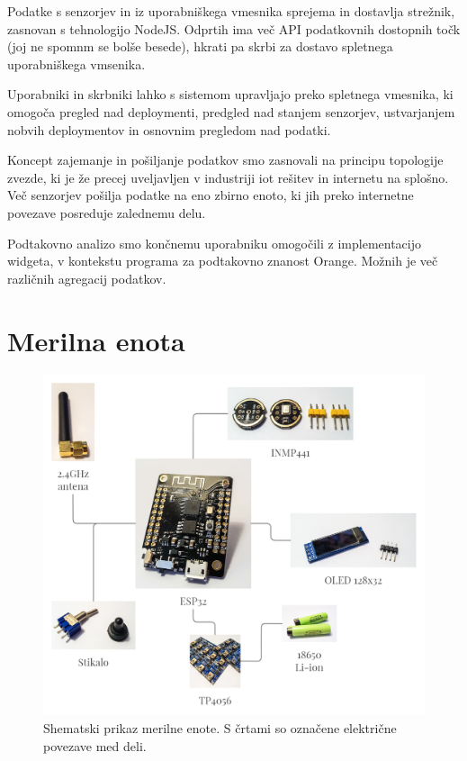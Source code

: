 \documentclass[a4paper, 12pt]{book}
\begin{document}
Podatke s senzorjev in iz uporabniškega vmesnika sprejema in dostavlja strežnik, zasnovan s tehnologijo NodeJS. Odprtih ima več API podatkovnih dostopnih točk (joj ne spomnm se bolše besede), hkrati pa skrbi za dostavo spletnega uporabniškega vmsenika. 

Uporabniki in skrbniki lahko s sistemom upravljajo preko spletnega vmesnika, ki omogoča pregled nad deploymenti, predgled nad stanjem senzorjev, ustvarjanjem nobvih deploymentov in osnovnim pregledom nad podatki.

Koncept zajemanje in pošiljanje podatkov smo zasnovali na principu topologije zvezde, ki je že precej uveljavljen v industriji iot rešitev in internetu na splošno. Več senzorjev pošilja podatke na eno zbirno enoto, ki jih preko internetne povezave posreduje zalednemu delu.

Podtakovno analizo smo končnemu uporabniku omogočili z implementacijo widgeta, v kontekstu programa za podtakovno znanost Orange. Možnih je več različnih agregacij podatkov.



\section{Merilna enota}


\begin{figure}[H]
    \centering
    \includegraphics[width=\linewidth]{slikovno_gradivo/Konceptualna shema merilne enote (2).png}
    \caption{Shematski prikaz merilne enote. S črtami so označene električne povezave med deli.}
    \label{fig:shema_merilna}
\end{figure}
\end{document}
